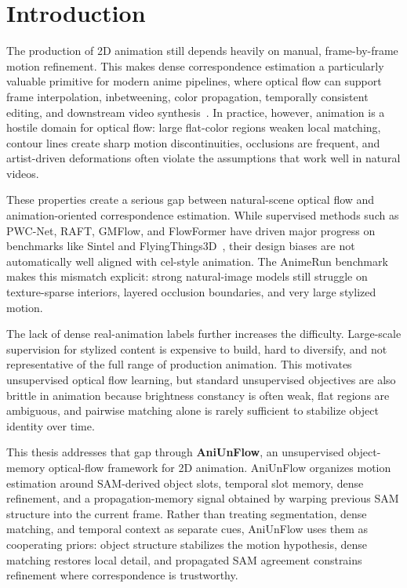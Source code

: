 \chapter{Introduction}

The production of 2D animation still depends heavily on manual, frame-by-frame motion refinement. This makes dense correspondence estimation a particularly valuable primitive for modern anime pipelines, where optical flow can support frame interpolation, inbetweening, color propagation, temporally consistent editing, and downstream video synthesis~\cite{animeinterp,superSloMo,softmaxSplat,linedrawingFlow,toonTracking}. In practice, however, animation is a hostile domain for optical flow: large flat-color regions weaken local matching, contour lines create sharp motion discontinuities, occlusions are frequent, and artist-driven deformations often violate the assumptions that work well in natural videos.

These properties create a serious gap between natural-scene optical flow and animation-oriented correspondence estimation. While supervised methods such as PWC-Net, RAFT, GMFlow, and FlowFormer have driven major progress on benchmarks like Sintel and FlyingThings3D~\cite{pwcnet,raft,gmflow,flowformer,sintel,ft3d}, their design biases are not automatically well aligned with cel-style animation. The AnimeRun benchmark~\cite{animerun} makes this mismatch explicit: strong natural-image models still struggle on texture-sparse interiors, layered occlusion boundaries, and very large stylized motion.

The lack of dense real-animation labels further increases the difficulty. Large-scale supervision for stylized content is expensive to build, hard to diversify, and not representative of the full range of production animation. This motivates unsupervised optical flow learning, but standard unsupervised objectives are also brittle in animation because brightness constancy is often weak, flat regions are ambiguous, and pairwise matching alone is rarely sufficient to stabilize object identity over time.

This thesis addresses that gap through \textbf{AniUnFlow}, an unsupervised object-memory optical-flow framework for 2D animation. AniUnFlow organizes motion estimation around SAM-derived object slots, temporal slot memory, dense refinement, and a propagation-memory signal obtained by warping previous SAM structure into the current frame. Rather than treating segmentation, dense matching, and temporal context as separate cues, AniUnFlow uses them as cooperating priors: object structure stabilizes the motion hypothesis, dense matching restores local detail, and propagated SAM agreement constrains refinement where correspondence is trustworthy.

